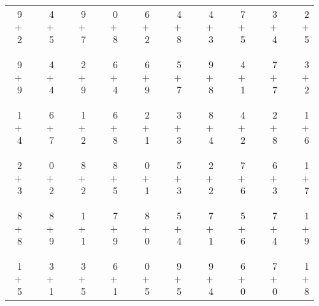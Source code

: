 \documentclass[12pt, letterpaper]{article}
\begin{document}
\newpage
\setcounter{page}{1}
\lfoot{\framebox{\makebox[\totalheight]{\thepage}}}
\begin{tabular}{rrrrrrrrrrrrrrrrrrr}
9 & & 4 & & 9 & & 0 & & 6 & & 4 & & 4 & & 7 & & 3 & & 2\\
$+$ 2 & & $+$ 5 & & $+$ 7 & & $+$ 8 & & $+$ 2 & & $+$ 8 & & $+$ 3 & & $+$ 5 & & $+$ 4 & & $+$ 5\\
\cline{1-1} \cline{3-3} \cline{5-5} \cline{7-7} \cline{9-9} \cline{11-11} \cline{13-13} \cline{15-15} \cline{17-17} \cline{19-19} \\ \\
9 & & 4 & & 2 & & 6 & & 6 & & 5 & & 9 & & 4 & & 7 & & 3\\
$+$ 9 & & $+$ 4 & & $+$ 9 & & $+$ 4 & & $+$ 9 & & $+$ 7 & & $+$ 8 & & $+$ 1 & & $+$ 7 & & $+$ 2\\
\cline{1-1} \cline{3-3} \cline{5-5} \cline{7-7} \cline{9-9} \cline{11-11} \cline{13-13} \cline{15-15} \cline{17-17} \cline{19-19} \\ \\
1 & & 6 & & 1 & & 6 & & 2 & & 3 & & 8 & & 4 & & 2 & & 1\\
$+$ 4 & & $+$ 7 & & $+$ 2 & & $+$ 8 & & $+$ 1 & & $+$ 3 & & $+$ 4 & & $+$ 2 & & $+$ 8 & & $+$ 6\\
\cline{1-1} \cline{3-3} \cline{5-5} \cline{7-7} \cline{9-9} \cline{11-11} \cline{13-13} \cline{15-15} \cline{17-17} \cline{19-19} \\ \\
2 & & 0 & & 8 & & 8 & & 0 & & 5 & & 2 & & 7 & & 6 & & 1\\
$+$ 3 & & $+$ 2 & & $+$ 2 & & $+$ 5 & & $+$ 1 & & $+$ 3 & & $+$ 2 & & $+$ 6 & & $+$ 3 & & $+$ 7\\
\cline{1-1} \cline{3-3} \cline{5-5} \cline{7-7} \cline{9-9} \cline{11-11} \cline{13-13} \cline{15-15} \cline{17-17} \cline{19-19} \\ \\
8 & & 8 & & 1 & & 7 & & 8 & & 5 & & 7 & & 5 & & 7 & & 1\\
$+$ 8 & & $+$ 9 & & $+$ 1 & & $+$ 9 & & $+$ 0 & & $+$ 4 & & $+$ 1 & & $+$ 6 & & $+$ 4 & & $+$ 9\\
\cline{1-1} \cline{3-3} \cline{5-5} \cline{7-7} \cline{9-9} \cline{11-11} \cline{13-13} \cline{15-15} \cline{17-17} \cline{19-19} \\ \\
1 & & 3 & & 3 & & 6 & & 0 & & 9 & & 9 & & 6 & & 7 & & 1\\
$+$ 5 & & $+$ 1 & & $+$ 5 & & $+$ 1 & & $+$ 5 & & $+$ 5 & & $+$ 4 & & $+$ 0 & & $+$ 0 & & $+$ 8\\

\end{tabular}
\end{document}
